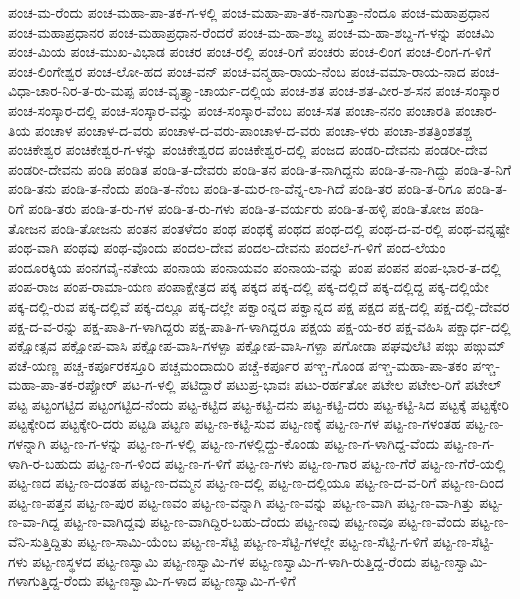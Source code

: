 ಪಂಚ-ಮ-ರೆಂದು
ಪಂಚ-ಮಹಾ-ಪಾ-ತಕ-ಗ-ಳಲ್ಲಿ
ಪಂಚ-ಮಹಾ-ಪಾ-ತಕ-ನಾಗುತ್ತಾ-ನೆಂದೂ
ಪಂಚ-ಮಹಾಪ್ರಧಾನ
ಪಂಚ-ಮಹಾಪ್ರಧಾನರ
ಪಂಚ-ಮಹಾಪ್ರಧಾನ-ರೆಂದರೆ
ಪಂಚ-ಮ-ಹಾ-ಶಬ್ದ
ಪಂಚ-ಮ-ಹಾ-ಶಬ್ದ-ಗ-ಳನ್ನು
ಪಂಚಮಿ
ಪಂಚ-ಮಿಯ
ಪಂಚ-ಮುಖ-ವಿಭಾಡ
ಪಂಚರ
ಪಂಚ-ರಲ್ಲಿ
ಪಂಚ-ರಿಗೆ
ಪಂಚರು
ಪಂಚ-ಲಿಂಗ
ಪಂಚ-ಲಿಂಗ-ಗ-ಳಿಗೆ
ಪಂಚ-ಲಿಂಗೇಶ್ವರ
ಪಂಚ-ಲೋ-ಹದ
ಪಂಚ-ವನ್
ಪಂಚ-ವನ್ಮಹಾ-ರಾಯ-ನೆಂಬ
ಪಂಚ-ವಮಾ-ರಾಯ-ನಾದ
ಪಂಚ-ವಿಧಾ-ಚಾರ-ನಿರ-ತ-ರು-ಮಪ್ಪ
ಪಂಚ-ವೃತ್ತ್ಯಾ-ಚಾರ್ಯ-ದಲ್ಲಿಯ
ಪಂಚ-ಶತ
ಪಂಚ-ಶತ-ವೀರ-ಶ-ಸನ
ಪಂಚ-ಸಂಸ್ಕಾರ
ಪಂಚ-ಸಂಸ್ಕಾರ-ದಲ್ಲಿ
ಪಂಚ-ಸಂಸ್ಕಾರ-ವನ್ನು
ಪಂಚ-ಸಂಸ್ಕಾರ-ವೆಂಬ
ಪಂಚ-ಸತ
ಪಂಚಾ-ನನಂ
ಪಂಚಾರತಿ
ಪಂಚಾರ-ತಿಯ
ಪಂಚಾಳ
ಪಂಚಾಳ-ದ-ವರು
ಪಂಚಾಳ-ದ-ವರು-ಪಾಂಚಾಳ-ದ-ವರು
ಪಂಚಾ-ಳರು
ಪಂಚಾ-ಶತತ್ರಿಂಶತಶ್ಚ
ಪಂಚಿಕೇಶ್ವರ
ಪಂಚಿಕೇಶ್ವರ-ಗ-ಳನ್ನು
ಪಂಚಿಕೇಶ್ವರದ
ಪಂಚಿಕೇಶ್ವರ-ದಲ್ಲಿ
ಪಂಜದ
ಪಂಡರಿ-ದೇವನು
ಪಂಡರೀ-ದೇವ
ಪಂಡರೀ-ದೇವನು
ಪಂಡಿ
ಪಂಡಿತ
ಪಂಡಿ-ತ-ದೇವರು
ಪಂಡಿ-ತನ
ಪಂಡಿ-ತ-ನಾಗಿದ್ದನು
ಪಂಡಿ-ತ-ನಾ-ಗಿದ್ದು
ಪಂಡಿ-ತ-ನಿಗೆ
ಪಂಡಿ-ತನು
ಪಂಡಿ-ತ-ನೆಂದು
ಪಂಡಿ-ತ-ನೆಂಬ
ಪಂಡಿ-ತ-ಮರ-ಣ-ವೆನ್ನ-ಲಾ-ಗಿದೆ
ಪಂಡಿ-ತರ
ಪಂಡಿ-ತ-ರಿಗೂ
ಪಂಡಿ-ತ-ರಿಗೆ
ಪಂಡಿ-ತರು
ಪಂಡಿ-ತ-ರು-ಗಳ
ಪಂಡಿ-ತ-ರು-ಗಳು
ಪಂಡಿ-ತ-ವರ್ಯರು
ಪಂಡಿ-ತ-ಹಳ್ಳಿ
ಪಂಡಿ-ತೋಜ
ಪಂಡಿ-ತೋಜನ
ಪಂಡಿ-ತೋಜನು
ಪಂತನ
ಪಂತಳೆದಂ
ಪಂಥ
ಪಂಥಕ್ಕೆ
ಪಂಥದ
ಪಂಥ-ದಲ್ಲಿ
ಪಂಥ-ದ-ವ-ರಲ್ಲಿ
ಪಂಥ-ವನ್ನಷ್ಟೇ
ಪಂಥ-ವಾಗಿ
ಪಂಥವು
ಪಂಥ-ವೊಂದು
ಪಂದಲ-ದೇವ
ಪಂದಲ-ದೇವನು
ಪಂದಲೆ-ಗ-ಳಿಗೆ
ಪಂದ-ಲೆಯಂ
ಪಂದೂರಕ್ಕಿಯ
ಪಂನಗವೈ-ನತೇಯ
ಪಂನಾಯ
ಪಂನಾಯವಂ
ಪಂನಾಯ-ವನ್ನು
ಪಂಪ
ಪಂಪನ
ಪಂಪ-ಭಾರ-ತ-ದಲ್ಲಿ
ಪಂಪ-ರಾಜ
ಪಂಪ-ರಾಮಾ-ಯಣ
ಪಂಪಾಕ್ಷೇತ್ರದ
ಪಕ್ಕ
ಪಕ್ಕದ
ಪಕ್ಕ-ದಲ್ಲಿ
ಪಕ್ಕ-ದಲ್ಲಿದೆ
ಪಕ್ಕ-ದಲ್ಲಿದ್ದ
ಪಕ್ಕ-ದಲ್ಲಿಯೇ
ಪಕ್ಕ-ದಲ್ಲಿ-ರುವ
ಪಕ್ಕ-ದಲ್ಲಿವೆ
ಪಕ್ಕ-ದಲ್ಲೂ
ಪಕ್ಕ-ದಲ್ಲೇ
ಪಕ್ವಾಂನ್ನದ
ಪಕ್ವಾನ್ನದ
ಪಕ್ಷ
ಪಕ್ಷದ
ಪಕ್ಷ-ದಲ್ಲಿ
ಪಕ್ಷ-ದಲ್ಲಿ-ದೇವರ
ಪಕ್ಷ-ದ-ವ-ರನ್ನು
ಪಕ್ಷ-ಪಾತಿ-ಗ-ಳಾಗಿದ್ದರು
ಪಕ್ಷ-ಪಾತಿ-ಗ-ಳಾಗಿದ್ದರೂ
ಪಕ್ಷಯ
ಪಕ್ಷ-ಯ-ಕರ
ಪಕ್ಷ-ವಹಿಸಿ
ಪಕ್ಷಾರ್ಧ-ದಲ್ಲಿ
ಪಕ್ಷೋತ್ಸವ
ಪಕ್ಷೋಪ-ವಾಸಿ
ಪಕ್ಷೋಪ-ವಾಸಿ-ಗಳಳ್ಪಾ
ಪಕ್ಷೋಪ-ವಾಸಿ-ಗಳ್ಪಾ
ಪಗೋಡಾ
ಪಘವುಲೆಟಿ
ಪಙ್ಗು
ಪಙ್ಗುಮ್
ಪಚೆ-ಯಣ್ಣ
ಪಚ್ಚ-ಕರ್ಪೂರಕಸ್ತೂರಿ
ಪಚ್ಚಮಂದಾದುರಿ
ಪಚ್ಚೆ-ಕರ್ಪೂರ
ಪಞ್ಚ-ಗೊಂಡ
ಪಞ್ಚ-ಮಹಾ-ಪಾ-ತಕಂ
ಪಞ್ಚ-ಮಹಾ-ಪಾ-ತಕ-ರಪ್ಪೋರ್
ಪಟ-ಗ-ಳಲ್ಲಿ
ಪಟಿದ್ದಾರೆ
ಪಟುಪ್ರ-ಭಾವಃ
ಪಟು-ರರ್ಹತೋ
ಪಟೇಲ
ಪಟೇಲ-ರಿಗೆ
ಪಟೇಲ್
ಪಟ್ಟ
ಪಟ್ಟಂಗಟ್ಟಿದ
ಪಟ್ಟಂಗಟ್ಟಿದ-ನೆಂದು
ಪಟ್ಟ-ಕಟ್ಟಿದ
ಪಟ್ಟ-ಕಟ್ಟಿ-ದನು
ಪಟ್ಟ-ಕಟ್ಟಿ-ದರು
ಪಟ್ಟ-ಕಟ್ಟಿ-ಸಿದ
ಪಟ್ಟಕ್ಕೆ
ಪಟ್ಟಕ್ಕೇರಿ
ಪಟ್ಟಕ್ಕೇರಿದ
ಪಟ್ಟಕ್ಕೇರಿ-ದರು
ಪಟ್ಟಡಿ
ಪಟ್ಟಣ
ಪಟ್ಟ-ಣ-ಕಟ್ಟಿ-ಸುವ
ಪಟ್ಟ-ಣಕ್ಕೆ
ಪಟ್ಟ-ಣ-ಗಳ
ಪಟ್ಟ-ಣ-ಗಳಂತಹ
ಪಟ್ಟ-ಣ-ಗಳನ್ನಾಗಿ
ಪಟ್ಟ-ಣ-ಗ-ಳನ್ನು
ಪಟ್ಟ-ಣ-ಗ-ಳಲ್ಲಿ
ಪಟ್ಟ-ಣ-ಗಳಲ್ಲಿದ್ದು-ಕೊಂಡು
ಪಟ್ಟ-ಣ-ಗ-ಳಾಗಿದ್ದ-ವೆಂದು
ಪಟ್ಟ-ಣ-ಗ-ಳಾಗಿ-ರ-ಬಹುದು
ಪಟ್ಟ-ಣ-ಗ-ಳಿಂದ
ಪಟ್ಟ-ಣ-ಗ-ಳಿಗೆ
ಪಟ್ಟ-ಣ-ಗಳು
ಪಟ್ಟ-ಣ-ಗಾರ
ಪಟ್ಟ-ಣ-ಗೆರೆ
ಪಟ್ಟ-ಣ-ಗೆರೆ-ಯಲ್ಲಿ
ಪಟ್ಟ-ಣದ
ಪಟ್ಟ-ಣ-ದಂತಹ
ಪಟ್ಟ-ಣ-ದಮ್ಮನ
ಪಟ್ಟ-ಣ-ದಲ್ಲಿ
ಪಟ್ಟ-ಣ-ದಲ್ಲಿಯೂ
ಪಟ್ಟ-ಣ-ದ-ವ-ರಿಗೆ
ಪಟ್ಟ-ಣ-ದಿಂದ
ಪಟ್ಟ-ಣ-ಪತ್ತನ
ಪಟ್ಟ-ಣ-ಪುರ
ಪಟ್ಟ-ಣವಂ
ಪಟ್ಟ-ಣ-ವನ್ನಾಗಿ
ಪಟ್ಟ-ಣ-ವನ್ನು
ಪಟ್ಟ-ಣ-ವಾಗಿ
ಪಟ್ಟ-ಣ-ವಾ-ಗಿತ್ತು
ಪಟ್ಟ-ಣ-ವಾ-ಗಿದ್ದ
ಪಟ್ಟ-ಣ-ವಾಗಿದ್ದವು
ಪಟ್ಟ-ಣ-ವಾಗಿದ್ದಿರ-ಬಹು-ದೆಂದು
ಪಟ್ಟ-ಣವು
ಪಟ್ಟ-ಣವೂ
ಪಟ್ಟ-ಣ-ವೆಂದು
ಪಟ್ಟ-ಣ-ವೆನಿ-ಸುತ್ತಿದ್ದಿತು
ಪಟ್ಟ-ಣ-ಸಾಮಿ-ಯೆಂಬ
ಪಟ್ಟ-ಣ-ಸೆಟ್ಟಿ
ಪಟ್ಟ-ಣ-ಸೆಟ್ಟಿ-ಗಳಲ್ಲೇ
ಪಟ್ಟ-ಣ-ಸೆಟ್ಟಿ-ಗ-ಳಿಗೆ
ಪಟ್ಟ-ಣ-ಸೆಟ್ಟಿ-ಗಳು
ಪಟ್ಟ-ಣಸ್ಥಳದ
ಪಟ್ಟ-ಣಸ್ವಾಮಿ
ಪಟ್ಟ-ಣಸ್ವಾಮಿ-ಗಳ
ಪಟ್ಟ-ಣಸ್ವಾಮಿ-ಗ-ಳಾಗಿ-ರುತ್ತಿದ್ದ-ರೆಂದು
ಪಟ್ಟ-ಣಸ್ವಾಮಿ-ಗಳಾಗುತ್ತಿದ್ದ-ರೆಂದು
ಪಟ್ಟ-ಣಸ್ವಾಮಿ-ಗ-ಳಾದ
ಪಟ್ಟ-ಣಸ್ವಾಮಿ-ಗ-ಳಿಗೆ
